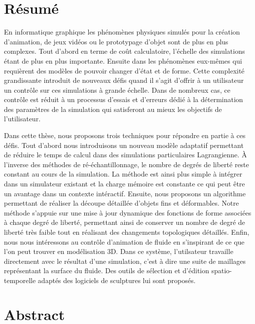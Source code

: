 
\chapter{R\'esum\'e}
En informatique graphique les phénomènes physiques simulés pour la création d'animation, de jeux vidéos ou le prototypage d'objet sont de plus en plus complexes. Tout d'abord en terme de coût calculatoire, l'échelle des simulations étant de plus en plus importante. Ensuite dans les phénomènes eux-mêmes qui requièrent des modèles de pouvoir changer d'état et de forme. Cette complexité grandissante introduit de nouveaux défis quand il s'agit d'offrir à un utilisateur un contrôle sur ces simulations à grande échelle. Dans de nombreux cas, ce contrôle est réduit à un processus d'essais et d'erreurs dédié à la détermination des paramètres de la simulation qui satisferont au mieux les objectifs de l'utilisateur.

Dans cette thèse, nous proposons trois techniques pour répondre en partie à ces défis. Tout d'abord nous introduisons un nouveau modèle adaptatif permettant de réduire le temps de calcul dans des simulations particulaires Lagrangienne. À l'inverse des méthodes de ré-échantillonnage, le nombre de degrés de liberté reste constant au cours de la simulation. La méthode est ainsi plus simple à intégrer dans un simulateur existant et la charge mémoire est constante ce qui peut être un avantage dans un contexte intéractif. Ensuite, nous proposons un algorithme permettant de réaliser la découpe détaillée d'objets fins et déformables. Notre méthode s'appuie sur une mise à jour dynamique des fonctions de forme associées à chaque degré de liberté, permettant ainsi de conserver un nombre de degré de liberté très faible tout en réalisant des changements topologiques détaillés. Enfin, nous nous intéressons au contrôle d'animation de fluide en s'inspirant de ce que l'on peut trouver en modélisation 3D. Dans ce système, l'utilsateur travaille directement avec le résultat d'une simulation, c'est à dire une suite de maillages représentant la surface du fluide. Des outils de sélection et d'édition spatio-temporelle adaptés des logiciels de sculptures lui sont proposés.

\chapter{Abstract}